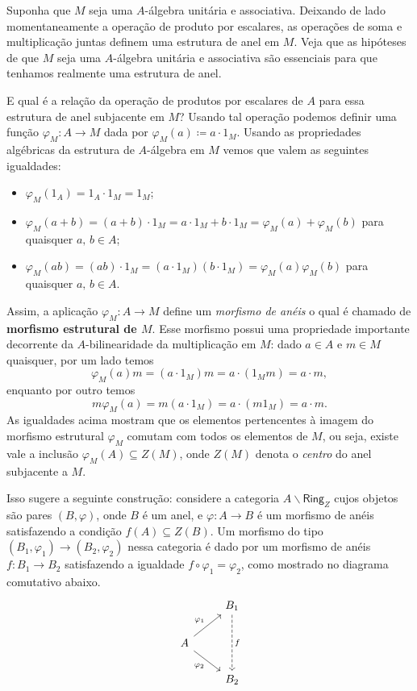 Suponha que $M$ seja uma $A$-álgebra unitária e associativa.
Deixando de lado momentaneamente a operação de produto por escalares, as operações de soma e multiplicação juntas definem uma estrutura de anel em $M$.
Veja que as hipóteses de que $M$ seja uma $A$-álgebra unitária e associativa são essenciais para que tenhamos realmente uma estrutura de anel.

E qual é a relação da operação de produtos por escalares de $A$ para essa estrutura de anel subjacente em $M$?
Usando tal operação podemos definir uma função $\varphi_M: A \to M$ dada por $\varphi_M(a) \coloneqq a \cdot 1_M$.
Usando as propriedades algébricas da estrutura de $A$-álgebra em $M$ vemos que valem as seguintes igualdades:
\begin{itemize}
\item $\varphi_M(1_A) = 1_A \cdot 1_M = 1_M$;
  
\item $\varphi_M(a+b) = (a+b) \cdot 1_M = a \cdot 1_M + b \cdot 1_M = \varphi_M(a) + \varphi_M(b)$ para quaisquer $a,\, b \in A$;
  
\item $\varphi_M(ab) = (ab) \cdot 1_M = (a \cdot 1_M)(b \cdot 1_M) = \varphi_M(a)\varphi_M(b)$ para quaisquer $a,\, b \in A$.
\end{itemize}
Assim, a aplicação $\varphi_{M}: A \to M$ define um \emph{morfismo de anéis} o qual é chamado de \textbf{morfismo estrutural de $M$}.
Esse morfismo possui uma propriedade importante decorrente da $A$-bilinearidade da multiplicação em $M$: dado $a \in A$ e $m \in M$ quaisquer, por um lado temos
\begin{displaymath}
  \varphi_{M}(a)m = (a \cdot 1_{M})m = a \cdot (1_{M}m) = a \cdot m,
\end{displaymath}
enquanto por outro temos
\begin{displaymath}
  m\varphi_{M}(a) = m(a \cdot 1_{M}) = a \cdot (m1_{M}) = a \cdot m.
\end{displaymath}
As igualdades acima mostram que os elementos pertencentes à imagem do morfismo estrutural $\varphi_{M}$ comutam com todos os elementos de $M$, ou seja, existe vale a inclusão $\varphi_{M}(A) \subseteq Z(M)$, onde $Z(M)$ denota o \emph{centro} do anel subjacente a $M$.

Isso sugere a seguinte construção: considere a categoria $A \backslash \mathsf{Ring}_{Z}$ cujos objetos são pares $(B,\varphi)$, onde $B$ é um anel, e $\varphi: A \to B$ é um morfismo de anéis satisfazendo a condição $f(A) \subseteq Z(B)$.
Um morfismo do tipo $(B_{1},\varphi_{1}) \to (B_{2},\varphi_{2})$ nessa categoria é dado por um morfismo de anéis $f: B_{1} \to B_{2}$ satisfazendo a igualdade $f \circ \varphi_{1} = \varphi_{2}$, como mostrado no diagrama comutativo abaixo.
\begin{displaymath}
  \begin{tikzcd}
    & B_{1}
    \arrow[dd, dashed, "f"]
    \\ A
    \arrow[ru, "\varphi_{1}"]
    \arrow[rd, "\varphi_{2}" swap]
    \\ & B_{2}
  \end{tikzcd}
\end{displaymath}

